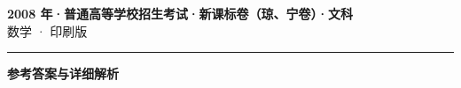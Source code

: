 \documentclass[zihao=5, a4paper]{ctexart}
\begin{document}
\begin{center}
  {\Large\bfseries 2008 年·普通高等学校招生考试·新课标卷（琼、宁卷）·文科}\\[4pt]
  {\large 数学 · 印刷版}
\end{center}
\medskip
{}

\par\bigskip\hrule\bigskip
{}
\begin{center}{\large\bfseries 参考答案与详细解析}\end{center}
\smallskip

\end{document}

